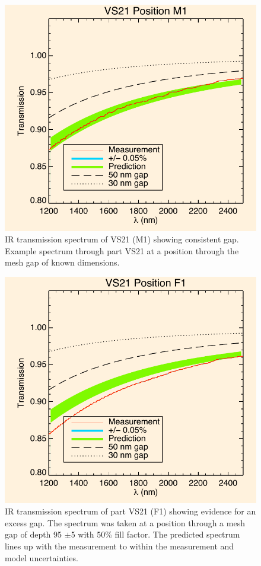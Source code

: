 \documentclass[osajnl,preprint,showpacs,superscriptaddress,12pt]{revtex4-1} %
\begin{document}
\begin{figure}[htbp]
\centerline{\includegraphics[width=.8\columnwidth]{figs/20130911_VS21posM1}}
\caption{IR transmission spectrum of VS21 (M1) showing consistent gap\label{VS21specm1}.  Example spectrum through part VS21 at a position through the mesh gap of known dimensions.}
\end{figure}

\begin{figure}[htbp]
\centerline{\includegraphics[width=.8\columnwidth]{figs/20130911_VS21posF1}}
\caption{IR transmission spectrum of part VS21 (F1) showing evidence for an excess gap\label{VS21specf1}.  The spectrum was taken at a position through a mesh gap of depth 95 $\pm$5 with 50\% fill factor.  The predicted spectrum lines up with the measurement to within the measurement and model uncertainties.}
\end{figure}
\end{document}
